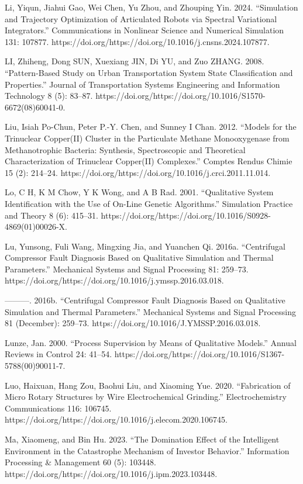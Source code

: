 \documentclass[utf8]{gradu3}
\begin{document}
Li, Yiqun, Jiahui Gao, Wei Chen, Yu Zhou, and Zhouping Yin. 2024. “Simulation and Trajectory Optimization of Articulated Robots via Spectral Variational Integrators.” Communications in Nonlinear Science and Numerical Simulation 131: 107877. https://doi.org/https://doi.org/10.1016/j.cnsns.2024.107877.

LI, Zhiheng, Dong SUN, Xuexiang JIN, Di YU, and Zuo ZHANG. 2008. “Pattern-Based Study on Urban Transportation System State Classification and Properties.” Journal of Transportation Systems Engineering and Information Technology 8 (5): 83–87. https://doi.org/https://doi.org/10.1016/S1570-6672(08)60041-0.

Liu, Isiah Po-Chun, Peter P.-Y. Chen, and Sunney I Chan. 2012. “Models for the Trinuclear Copper(II) Cluster in the Particulate Methane Monooxygenase from Methanotrophic Bacteria: Synthesis, Spectroscopic and Theoretical Characterization of Trinuclear Copper(II) Complexes.” Comptes Rendus Chimie 15 (2): 214–24. https://doi.org/https://doi.org/10.1016/j.crci.2011.11.014.

Lo, C H, K M Chow, Y K Wong, and A B Rad. 2001. “Qualitative System Identification with the Use of On-Line Genetic Algorithms.” Simulation Practice and Theory 8 (6): 415–31. https://doi.org/https://doi.org/10.1016/S0928-4869(01)00026-X.

Lu, Yunsong, Fuli Wang, Mingxing Jia, and Yuanchen Qi. 2016a. “Centrifugal Compressor Fault Diagnosis Based on Qualitative Simulation and Thermal Parameters.” Mechanical Systems and Signal Processing 81: 259–73. https://doi.org/https://doi.org/10.1016/j.ymssp.2016.03.018.

———. 2016b. “Centrifugal Compressor Fault Diagnosis Based on Qualitative Simulation and Thermal Parameters.” Mechanical Systems and Signal Processing 81 (December): 259–73. https://doi.org/10.1016/J.YMSSP.2016.03.018.

Lunze, Jan. 2000. “Process Supervision by Means of Qualitative Models.” Annual Reviews in Control 24: 41–54. https://doi.org/https://doi.org/10.1016/S1367-5788(00)90011-7.

Luo, Haixuan, Hang Zou, Baohui Liu, and Xiaoming Yue. 2020. “Fabrication of Micro Rotary Structures by Wire Electrochemical Grinding.” Electrochemistry Communications 116: 106745. https://doi.org/https://doi.org/10.1016/j.elecom.2020.106745.

Ma, Xiaomeng, and Bin Hu. 2023. “The Domination Effect of the Intelligent Environment in the Catastrophe Mechanism of Investor Behavior.” Information Processing \& Management 60 (5): 103448. https://doi.org/https://doi.org/10.1016/j.ipm.2023.103448.
\end{document}
